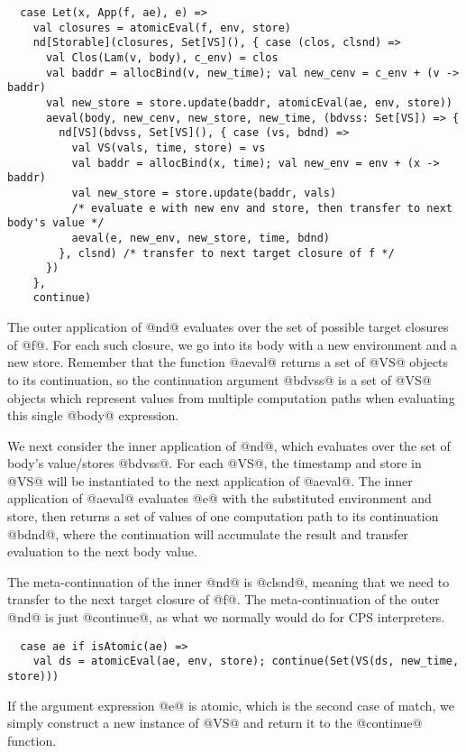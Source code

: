 \documentclass[acmsmall, review]{acmart}\settopmatter{}
\begin{document}
\begin{lstlisting}
  case Let(x, App(f, ae), e) =>
    val closures = atomicEval(f, env, store)
    nd[Storable](closures, Set[VS](), { case (clos, clsnd) =>
      val Clos(Lam(v, body), c_env) = clos
      val baddr = allocBind(v, new_time); val new_cenv = c_env + (v -> baddr)
      val new_store = store.update(baddr, atomicEval(ae, env, store))
      aeval(body, new_cenv, new_store, new_time, (bdvss: Set[VS]) => {
        nd[VS](bdvss, Set[VS](), { case (vs, bdnd) =>
          val VS(vals, time, store) = vs
          val baddr = allocBind(x, time); val new_env = env + (x -> baddr)
          val new_store = store.update(baddr, vals)
          /* evaluate e with new env and store, then transfer to next body's value */
          aeval(e, new_env, new_store, time, bdnd)
        }, clsnd) /* transfer to next target closure of f */
      })
    },
    continue)
\end{lstlisting}

The outer application of @nd@ evaluates over the set of possible target closures of
@f@. For each such closure, we go into its body with a new environment and a new store.
Remember that the function @aeval@ returns a set of @VS@ objects to its continuation,
so the continuation argument @bdvss@ is a set of @VS@ objects which represent values
from multiple computation paths when evaluating this single @body@ expression.

We next consider the inner application of @nd@, which evaluates over the set of body's 
value/stores @bdvss@. For each @VS@, the timestamp and store in @VS@ will be instantiated to
the next application of @aeval@. The inner application of @aeval@ evaluates @e@ with the
substituted environment and store, then returns a set of values of one computation path 
to its continuation @bdnd@, where the continuation will accumulate the result and 
transfer evaluation to the next body value.

The meta-continuation of the inner @nd@ is @clsnd@, meaning that we need to transfer 
to the next target closure of @f@. The meta-continuation of the outer @nd@ is just 
@continue@, as what we normally would do for CPS interpreters.

\begin{lstlisting}
  case ae if isAtomic(ae) => 
    val ds = atomicEval(ae, env, store); continue(Set(VS(ds, new_time, store)))
\end{lstlisting}

If the argument expression @e@ is atomic, which is the second case of match, we simply 
construct a new instance of @VS@ and return it to the @continue@ function.
\end{document}
